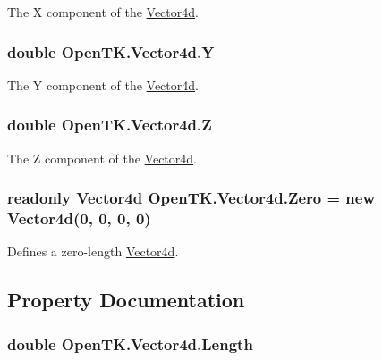 The X component of the \hyperlink{struct_open_t_k_1_1_vector4d}{Vector4d}. 

\hypertarget{struct_open_t_k_1_1_vector4d_a4937063b60b49337bf5ed66f2d360219}{
\subsubsection[{Y}]{\setlength{\rightskip}{0pt plus 5cm}double Open\-T\-K.\-Vector4d.\-Y}}\label{struct_open_t_k_1_1_vector4d_a4937063b60b49337bf5ed66f2d360219}


The Y component of the \hyperlink{struct_open_t_k_1_1_vector4d}{Vector4d}. 

\hypertarget{struct_open_t_k_1_1_vector4d_a73d5452aab4b549eecaeb9261e85d184}{
\subsubsection[{Z}]{\setlength{\rightskip}{0pt plus 5cm}double Open\-T\-K.\-Vector4d.\-Z}}\label{struct_open_t_k_1_1_vector4d_a73d5452aab4b549eecaeb9261e85d184}


The Z component of the \hyperlink{struct_open_t_k_1_1_vector4d}{Vector4d}. 

\hypertarget{struct_open_t_k_1_1_vector4d_acd01e6c83590d1bd9fcc89d526f86f48}{
\subsubsection[{Zero}]{\setlength{\rightskip}{0pt plus 5cm}readonly {\bf Vector4d} Open\-T\-K.\-Vector4d.\-Zero = new {\bf Vector4d}(0, 0, 0, 0)\hspace{0.3cm}{\ttfamily [static]}}}\label{struct_open_t_k_1_1_vector4d_acd01e6c83590d1bd9fcc89d526f86f48}


Defines a zero-\/length \hyperlink{struct_open_t_k_1_1_vector4d}{Vector4d}. 



\subsection{Property Documentation}
\hypertarget{struct_open_t_k_1_1_vector4d_ab9f920535e4630430c8b2a6affcdb6a4}{
\subsubsection[{Length}]{\setlength{\rightskip}{0pt plus 5cm}double Open\-T\-K.\-Vector4d.\-Length\hspace{0.3cm}{\ttfamily [get]}}}\label{struct_open_t_k_1_1_vector4d_ab9f920535e4630430c8b2a6affcdb6a4}


